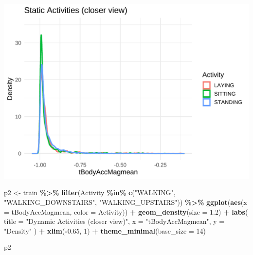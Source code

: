 \documentclass[
]{article}
\newenvironment{Shaded}{\begin{snugshade}}{\end{snugshade}}
\newcommand{\AttributeTok}[1]{\textcolor[rgb]{0.13,0.29,0.53}{#1}}
\newcommand{\DecValTok}[1]{\textcolor[rgb]{0.00,0.00,0.81}{#1}}
\newcommand{\FloatTok}[1]{\textcolor[rgb]{0.00,0.00,0.81}{#1}}
\newcommand{\FunctionTok}[1]{\textcolor[rgb]{0.13,0.29,0.53}{\textbf{#1}}}
\newcommand{\NormalTok}[1]{#1}
\newcommand{\OtherTok}[1]{\textcolor[rgb]{0.56,0.35,0.01}{#1}}
\newcommand{\SpecialCharTok}[1]{\textcolor[rgb]{0.81,0.36,0.00}{\textbf{#1}}}
\newcommand{\StringTok}[1]{\textcolor[rgb]{0.31,0.60,0.02}{#1}}
\begin{document}
\includegraphics{report_files/figure-latex/unnamed-chunk-17-1.pdf}

\begin{Shaded}
\begin{Highlighting}[]
\NormalTok{p2 }\OtherTok{\textless{}{-}}\NormalTok{ train }\SpecialCharTok{\%\textgreater{}\%}
  \FunctionTok{filter}\NormalTok{(Activity }\SpecialCharTok{\%in\%} \FunctionTok{c}\NormalTok{(}\StringTok{"WALKING"}\NormalTok{, }\StringTok{"WALKING\_DOWNSTAIRS"}\NormalTok{, }\StringTok{"WALKING\_UPSTAIRS"}\NormalTok{)) }\SpecialCharTok{\%\textgreater{}\%}
  \FunctionTok{ggplot}\NormalTok{(}\FunctionTok{aes}\NormalTok{(}\AttributeTok{x =}\NormalTok{ tBodyAccMagmean, }\AttributeTok{color =}\NormalTok{ Activity)) }\SpecialCharTok{+}
  \FunctionTok{geom\_density}\NormalTok{(}\AttributeTok{size =} \FloatTok{1.2}\NormalTok{) }\SpecialCharTok{+}
  \FunctionTok{labs}\NormalTok{(}
    \AttributeTok{title =} \StringTok{"Dynamic Activities (closer view)"}\NormalTok{,}
    \AttributeTok{x =} \StringTok{"tBodyAccMagmean"}\NormalTok{,}
    \AttributeTok{y =} \StringTok{"Density"}
\NormalTok{  ) }\SpecialCharTok{+} \FunctionTok{xlim}\NormalTok{(}\SpecialCharTok{{-}}\FloatTok{0.65}\NormalTok{, }\DecValTok{1}\NormalTok{) }\SpecialCharTok{+}
  \FunctionTok{theme\_minimal}\NormalTok{(}\AttributeTok{base\_size =} \DecValTok{14}\NormalTok{)}

\NormalTok{p2}
\end{Highlighting}
\end{Shaded}
\end{document}
